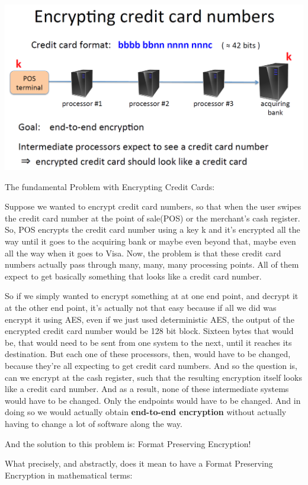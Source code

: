 \documentclass[11pt]{article}
\makeatletter
\def\maxwidth{\ifdim\Gin@nat@width>\linewidth\linewidth
    \else\Gin@nat@width\fi}
\let\Oldincludegraphics\includegraphics
\renewcommand{\includegraphics}[1]{\Oldincludegraphics[width=.8\maxwidth]{#1}}
\makeatother
\begin{document}
\includegraphics{./Images/CreditCardEncryption.png}

The fundamental Problem with Encrypting Credit Cards:

Suppose we wanted to encrypt credit card numbers, so that when the user
swipes the credit card number at the point of sale(POS) or the
merchant's cash register. So, POS encrypts the credit card number using
a key k and it's encrypted all the way until it goes to the acquiring
bank or maybe even beyond that, maybe even all the way when it goes to
Visa. Now, the problem is that these credit card numbers actually pass
through many, many, many processing points. All of them expect to get
basically something that looks like a credit card number.

So if we simply wanted to encrypt something at at one end point, and
decrypt it at the other end point, it's actually not that easy because
if all we did was encrypt it using AES, even if we just used
deterministic AES, the output of the encrypted credit card number would
be 128 bit block. Sixteen bytes that would be, that would need to be
sent from one system to the next, until it reaches its destination. But
each one of these processors, then, would have to be changed, because
they're all expecting to get credit card numbers. And so the question
is, can we encrypt at the cash register, such that the resulting
encryption itself looks like a credit card number. And as a result, none
of these intermediate systems would have to be changed. Only the
endpoints would have to be changed. And in doing so we would actually
obtain \textbf{end-to-end encryption} without actually having to change
a lot of software along the way.

And the solution to this problem is: Format Preserving Encryption!

What precisely, and abstractly, does it mean to have a Format Preserving
Encryption in mathematical terms:
\end{document}
